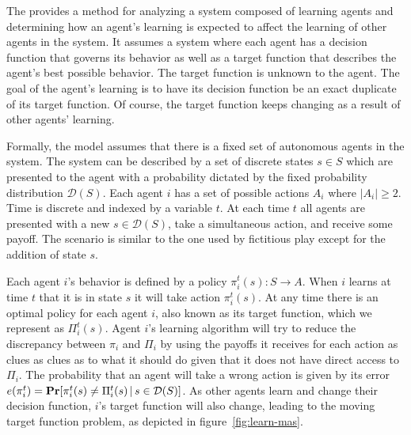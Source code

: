 The  \cite{vidalclri} provides a method for analyzing a
system composed of learning agents and determining how an agent's
learning is expected to affect the learning of other agents in the
system.  It assumes a system where each agent has a decision function
that governs its behavior as well as a target function that describes
the agent's best possible behavior. The target function is unknown to
the agent. The goal of the agent's learning is to have its decision
function be an exact duplicate of its target function. Of course, the
target function keeps changing as a result of other agents' learning.

Formally, the  model assumes that there is a fixed set of
autonomous agents in the system.  The system can be described by a set
of discrete states $s \in S$ which are presented to the agent with a
probability dictated by the fixed probability distribution
$\mathcal{D}(S)$.  Each agent $i$ has a set of possible actions $A_i$
where $|A_i| \geq 2$. Time is discrete and indexed by a variable $t$.
At each time $t$ all agents are presented with a new $s \in
\mathcal{D}(S)$, take a simultaneous action, and receive some payoff.
The scenario is similar to the one used by fictitious play except for
the addition of state $s$.

Each agent $i$'s behavior is defined by a policy $\pi_i^t(s) : S
\rightarrow A$. When $i$ learns at time $t$ that it is in state $s$ it
will take action $\pi_i^t(s)$. At any time there is an optimal policy
for each agent $i$, also known as its target function, which we
represent as $\Pi_i^t(s)$. Agent $i$'s learning algorithm will try to
reduce the discrepancy between $\pi_i$ and $\Pi_i$ by using the
payoffs it receives for each action as clues as clues as to what it
should do given that it does not have direct access to $\Pi_i$. The
probability that an agent will take a wrong action is given by its
error $e(\pi_i^t) = \mathbf{Pr}[\pi_i^t(s) \neq \Pi_i^t(s) \,|\, s
\in \mathcal{D}(S)]$. As other agents learn and change their decision
function, $i$'s target function will also change, leading to the
moving target function problem, as depicted in
figure~\ref{fig:learn-mas}.


\begin{SCfigure}
  \begin{minipage}{1.0\linewidth}
  \begin{center}
  \end{center}
  \end{minipage}
  \caption{The moving target function problem.}
  \label{fig:learn-mas}
\end{SCfigure}



